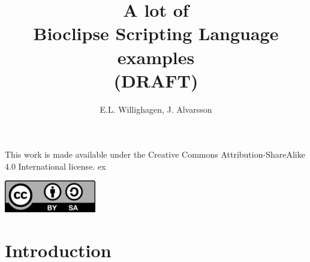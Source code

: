 \documentclass[a5paper, 10pt]{memoir}
\title{A lot of \\ Bioclipse Scripting Language \\ examples \\ (DRAFT)}
\author{E.L. Willighagen, J. Alvarsson}
\begin{document}
\maketitle

\newpage
\pagestyle{plain}
\mbox{}\vfill
{\noindent \textsf{This work is made available under the Creative Commons
Attribution-ShareAlike 4.0 International license.}}
 ex
\begin{center}
	\includegraphics[width=0.3\textwidth]{ccbysa.png}
\end{center}
\vfill
\newpage

\tableofcontents

\chapter{Introduction}
\end{document}
